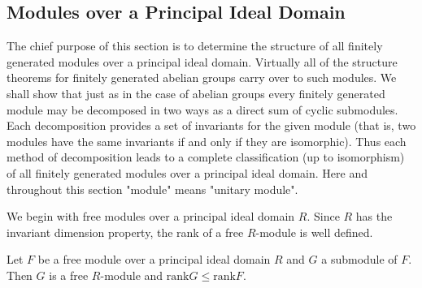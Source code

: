 \subsection{Modules over a Principal Ideal Domain}
The chief purpose of this section is to determine the structure of all finitely generated modules over a principal ideal domain. Virtually all of the structure theorems for finitely generated abelian groups carry over to such modules. We shall show that just as in the case of abelian groups every finitely generated module may be decomposed in two ways as a direct sum of cyclic submodules. Each decomposition provides a set of invariants for the given module (that is, two modules have the same 
invariants if and only if they are isomorphic). Thus each method of decomposition leads to a complete classification (up to isomorphism) of all finitely generated modules over a principal ideal domain. Here and throughout this section "module" means "unitary module".\par
We begin with free modules over a principal ideal domain $R$. Since $R$ has the invariant dimension property, the rank of a free $R$-module is well defined.
\begin{theorem}
Let $F$ be a free module over a principal ideal domain $R$ and $G$ a submodule of $F$. Then $G$ is a free $R$-module and $\mathrm{rank}G\le\mathrm{rank}F$.
\end{theorem}
